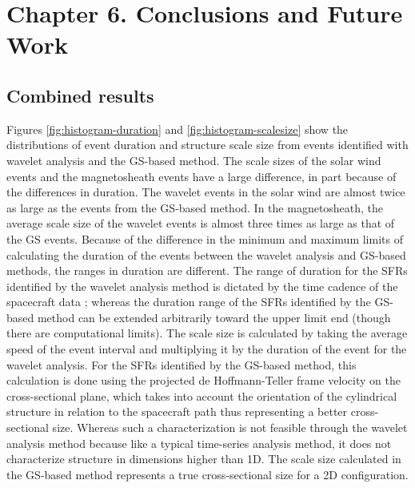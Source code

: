 \chapter{Chapter 6. Conclusions and Future Work}

\section{Combined results}
Figures \ref{fig:histogram-duration} and \ref{fig:histogram-scalesize} show the distributions of event duration and structure scale size from events identified with wavelet analysis and the GS-based method. The scale sizes of the solar wind events and the magnetosheath events have a large difference, in part because of the differences in duration. The wavelet events in the solar wind are almost twice as large as the events from the GS-based method. In the magnetosheath, the average scale size of the wavelet events is almost three times as large as that of the GS events. Because of the difference in the minimum and maximum limits of calculating the duration of the events between the wavelet analysis and GS-based methods, the ranges in duration are different. The range of duration for the SFRs identified by the wavelet analysis method is dictated by the time cadence of the spacecraft data \citep{Torrence:1998}; whereas the duration range of the SFRs identified by the GS-based method can be extended arbitrarily toward the upper limit end (though there are computational limits). The scale size is calculated by taking the average speed of the event interval and multiplying it by the duration of the event for the wavelet analysis. For the SFRs identified by the GS-based method, this calculation is done using the projected de Hoffmann-Teller frame velocity on the cross-sectional plane, which takes into account the orientation of the cylindrical structure in relation to the spacecraft path thus representing a better cross-sectional size. Whereas such a characterization is not feasible through the wavelet analysis method because like a typical time-series analysis method, it does not characterize structure in dimensions higher than 1D. The scale size calculated in the GS-based method represents a true cross-sectional size for a 2D configuration. 

